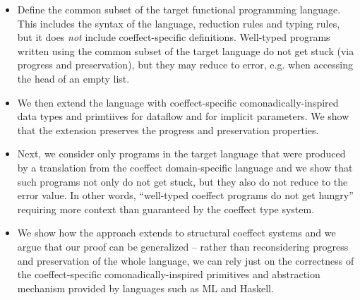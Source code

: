 \documentclass[
		twoside,openright,titlepage,numbers=noenddot,headinclude,%
                footinclude=true,cleardoublepage=empty,
                BCOR=10mm,paper=a4,fontsize=10pt, %
                ngerman,american, %
                ]{scrreprt}
\newcommand{\ident}[1]{\textnormal{\sffamily #1}}
\begin{document}
\begin{itemize}
\item Define the common subset of the target functional programming language. This includes the
  syntax of the language, reduction rules and typing rules, but it does \emph{not} include 
  coeffect-specific definitions. Well-typed programs written using the common subset of the 
  target language do not get stuck (via progress and preservation), but they may reduce to 
  \ident{error}, e.g. when accessing the head of an empty list.
  
\item We then extend the language with coeffect-specific comonadically-inspired
  data types and primtiives for dataflow and for implicit parameters. We show that the extension
  preserves the progress and preservation properties. 
  
\item Next, we consider only programs in the target language that were produced by a
  translation from the coeffect domain-specific language and we show that such programs not only
  do not get stuck, but they also do not reduce to the \ident{error} value. In other words,
  ``well-typed coeffect programs do not get hungry'' requiring more context than guaranteed
  by the coeffect type system.

\item We show how the approach extends to structural coeffect systems and we argue that our
  proof can be generalized -- rather than reconsidering progress and preservation of the 
  whole language, we can rely just on the correctness of the coeffect-specific comonadically-inspired
  primitives and abstraction mechanism provided by languages such as ML and Haskell.  
\end{itemize}  

\end{document}
